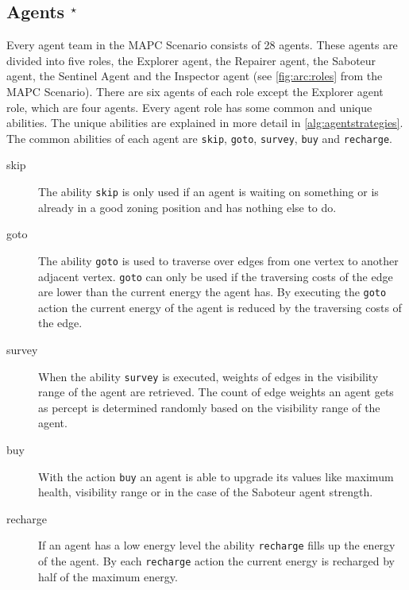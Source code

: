 \subsection[Agents]{Agents $^{\star}$}\label{arc:agents}
Every agent team in the MAPC Scenario consists of 28 agents. These agents are divided into five roles, the Explorer agent, the Repairer agent, the Saboteur agent, the Sentinel Agent and the Inspector agent (see \autoref{fig:arc:roles} from the MAPC Scenario). There are six agents of each role except the Explorer agent role, which are four agents. Every agent role has some common and unique abilities. The unique abilities are explained in more detail in \autoref{alg:agentstrategies}. The common abilities of each agent are \texttt{skip}, \texttt{goto}, \texttt{survey}, \texttt{buy} and \texttt{recharge}. 
\begin{description}
   \item[skip] The ability \texttt{skip} is only used if an agent is waiting on something or is already in a good zoning position and has nothing else to do.
   \item[goto] The ability \texttt{goto} is used to traverse over edges from one vertex to another adjacent vertex. \texttt{goto} can only be used if the traversing costs of the edge are lower than the current energy the agent has. By executing the \texttt{goto} action the current energy of the agent is reduced by the traversing costs of the edge.
   \item[survey] When the ability \texttt{survey} is executed, weights of edges in the visibility range of the agent are retrieved. The count of edge weights an agent gets as percept is determined randomly based on the visibility range of the agent.
   \item[buy] With the action \texttt{buy} an agent is able to upgrade its values like maximum health, visibility range or in the case of the Saboteur agent strength.
   \item[recharge] If an agent has a low energy level the ability \texttt{recharge} fills up the energy of the agent. By each \texttt{recharge} action the current energy is recharged by half of the maximum energy.
\end{description}

